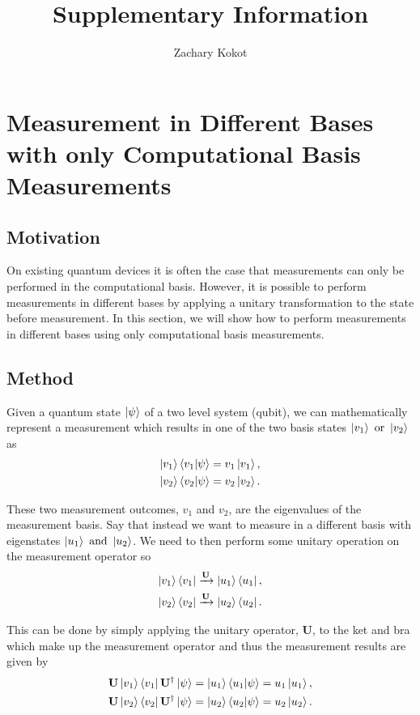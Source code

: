 \documentclass[12pt]{article}
\author{Zachary Kokot}
\title{Supplementary Information}
\begin{document}
    \maketitle

    \tableofcontents

    \newpage

    \section{Measurement in Different Bases with only Computational Basis Measurements}
    \subsection{Motivation}
    On existing quantum devices it is often the case that measurements can only be performed in the computational basis. However, it is possible to perform measurements in different bases by applying a unitary transformation to the state before measurement. In this section, we will show how to perform measurements in different bases using only computational basis measurements.

    \subsection{Method}
    Given a quantum state $\ket{\psi}$ of a two level system (qubit), we can mathematically represent a measurement which results in one of the two basis states $\ket{v_1} \text{ or } \ket{v_2}$ as 
    \begin{align*}
        \ket{v_1} \braket{v_1 | \psi} &= v_1 \ket{v_1}, \\
        \ket{v_2} \braket{v_2 | \psi} &= v_2 \ket{v_2}.
    \end{align*}

    These two measurement outcomes, $v_1$ and $v_2$, are the eigenvalues of the measurement basis. Say that instead we want to measure in a different basis with eigenstates $\ket{u_1} \text{ and } \ket{u_2}$. We need to then perform some unitary operation on the measurement operator so 
    \begin{align*}
        \ket{v_1} \bra{v_1} &\xrightarrow{\mathbf{U}} \ket{u_1} \bra{u_1},\\
        \ket{v_2} \bra{v_2} &\xrightarrow{\mathbf{U}} \ket{u_2} \bra{u_2}.
    \end{align*}

    This can be done by simply applying the unitary operator, $\mathbf{U}$, to the ket and bra which make up the measurement operator and thus the measurement results are given by 
    \begin{align*}
        \mathbf{U} \ket{v_1} \bra{v_1} \mathbf{U}^\dagger \ket{\psi} &= \ket{u_1} \braket{u_1 | \psi} = u_1 \ket{u_1}, \\
        \mathbf{U} \ket{v_2} \bra{v_2} \mathbf{U}^\dagger \ket{\psi} &= \ket{u_2} \braket{u_2 | \psi} = u_2 \ket{u_2}.
    \end{align*}
\end{document}
